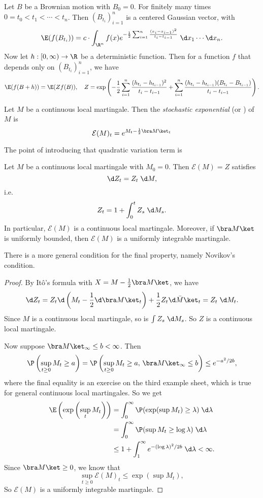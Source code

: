 \documentclass[a4paper]{article}
\begin{document}
\begin{eg}
  Let $B$ be a Brownian motion with $B_0 = 0$. For finitely many times $0 = t_0 < t_1 < \cdots < t_n$. Then $(B_{t_i})_{i = 1}^n$ is a centered Gaussian vector, with
  \[
    \E (f(B_{t_i})) = c \cdot \int_{\R^n} f(x) e^{-\frac{1}{2} \sum_{i = 1}^n \frac{(x_i - x_{i - 1})^2}{t_i - t_{i - 1}}}\;\d x_1 \cdots \d x_n.
  \]
  Now let $h: [0, \infty) \to \R$ be a deterministic function. Then for a function $f$ that depends only on $(B_{t_i})_{i = 1}^n$, we have
  \[
    \E (f (B + h)) = \E (Z f(B)),\quad Z = \exp \left(-\frac{1}{2} \sum_{i = 1}^n \frac{(h_{t_i} - h_{t_{i - 1}})^2}{t_i - t_{i - 1}} + \sum_{i = 1}^n \frac{(h_{t_i} - h_{t_{i - 1}})(B_{t_i} - B_{t_{i - 1}})}{t_i - t_{i - 1}}\right).
  \]
\end{eg}

\begin{defi}
  Let $M$ be a continuous local martingale. Then the \emph{stochastic exponential} (or ) of $M$ is
  \[
    \mathcal{E}(M)_t = e^{M_t - \frac{1}{2} \bra M\ket_t}
  \]
\end{defi}
The point of introducing that quadratic variation term is
\begin{prop}
  Let $M$ be a continuous local martingale with $M_0 = 0$. Then $\mathcal{E}(M) = Z$ satisfies
  \[
    \d Z_t = Z_t \;\d M,
  \]
  i.e.
  \[
    Z_t = 1 + \int_0^t Z_s \;\d M_s.
  \]
  In particular, $\mathcal{E}(M)$ is a continuous local martingale. Moreover, if $\bra M\ket$ is uniformly bounded, then $\mathcal{E}(M)$ is a uniformly integrable martingale.
\end{prop}
There is a more general condition for the final property, namely Novikov's condition.

\begin{proof}
  By It\^o's formula with $X = M - \frac{1}{2} \bra M\ket$, we have
  \[
    \d Z_t = Z_t \d \left(M_t - \frac{1}{2} \d \bra M\ket_t\right) + \frac{1}{2} Z_t \d \bar M\ket_t = Z_t \;\d M_t.
  \]
  Since $M$ is a continuous local martingale, so is $\int Z_s \;\d M_s$. So $Z$ is a continuous local martingale.

  Now suppose $\bra M\ket_\infty \leq b < \infty$. Then
  \[
    \P \left(\sup_{t \geq 0} M_t \geq a\right) = \P \left(\sup_{t \geq 0} M_t \geq a,\, \bra M\ket_\infty \leq b\right) \leq e^{-a^2/2b},
  \]
  where the final equality is an exercise on the third example sheet, which is true for general continuous local martingales. So we get
  \begin{align*}
    \E \left(\exp \left(\sup_t M_t\right)\right) &= \int_0^\infty \P(\exp (\sup M_t)\geq \lambda)\;\d \lambda \\
    &= \int_0^\infty \P (\sup M_t \geq \log \lambda)\;\d \lambda\\
    &\leq 1 + \int_1^\infty e^{-(\log \lambda)^2/2b} \;\d \lambda < \infty.
  \end{align*}
  Since $\bra M\ket \geq 0$, we know that
  \[
    \sup_{t \geq 0} \mathcal{E}(M)_t \leq \exp \left(\sup M_t\right),
  \]
  So $\mathcal{E}(M)$ is a uniformly integrable martingale. 
\end{proof}
\end{document}
